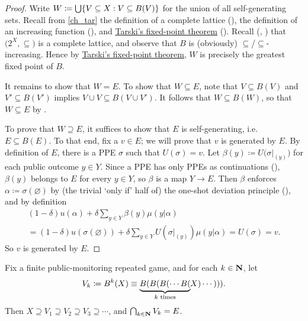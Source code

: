 \begin{proof}
	Write $W \coloneqq \Union \left\{ V \subseteq X : V \subseteq B(V) \right\}$ for the union of all self-generating sets. Recall from \cref{ch_tar} the definition of a complete lattice (), the definition of an increasing function (), and \hyperref[theorem:tarski]{Tarski's fixed-point theorem} (). Recall (, ) that $\bigl( 2^X, \subseteq \bigr)$ is a complete lattice, and observe that $B$ is (obviously) $\subseteq$/$\subseteq$-increasing. Hence by \hyperref[theorem:tarski]{Tarski's fixed-point theorem}, $W$ is precisely the greatest fixed point of $B$.

	It remains to show that $W = E$. To show that $W \subseteq E$, note that $V \subseteq B(V)$ and $V' \subseteq B(V')$ implies $V \cup V \subseteq B(V \cup V')$. It follows that $W \subseteq B\left( W \right)$, so that $W \subseteq E$ by .

	To prove that $W \supseteq E$, it suffices to show that $E$ is self-generating, i.e. $E \subseteq B(E)$. To that end, fix a $v \in E$; we will prove that $v$ is generated by $E$. By definition of $E$, there is a PPE $\sigma$ such that $U(\sigma)=v$. Let $\beta(y) \coloneqq U\bigl( \sigma|_{(y)} \bigr)$ for each public outcome $y \in Y$. Since a PPE has only PPEs as continuations (), $\beta(y)$ belongs to $E$ for every $y \in Y$, so $\beta$ is a map $Y \to E$. Then $\beta$ enforces $\alpha \coloneqq \sigma(\varnothing)$ by (the trivial `only if' half of) the one-shot deviation principle (), and by definition
	\begin{multline*}
		(1-\delta) u(\alpha)
		+ \delta \sum_{y \in Y} \beta(y) \mu(y|\alpha)
		\\
		= (1-\delta) u(\sigma(\varnothing))
		+ \delta \sum_{y \in Y} U\left( \sigma|_{(y)} \right) \mu(y|\alpha)
		= U(\sigma)
		= v .
	\end{multline*}
	So $v$ is generated by $E$.
\end{proof}

\begin{proposition}
	\label{proposition:ppe_algo}
	Fix a finite public-monitoring repeated game, and for each $k \in \mathbf{N}$, let
	\begin{equation*}
		V_k
		\coloneqq B^k(X)
		\equiv \underbrace{B(B(B(\cdots B(}_{\text{$k$ times}}\hspace{-2pt}X)\cdots))) .
	\end{equation*}
	Then $X \supseteq V_1 \supseteq V_2 \supseteq V_3 \supseteq \cdots$, and $\bigcap_{k \in \mathbf{N}} V_k = E$.
\end{proposition}

